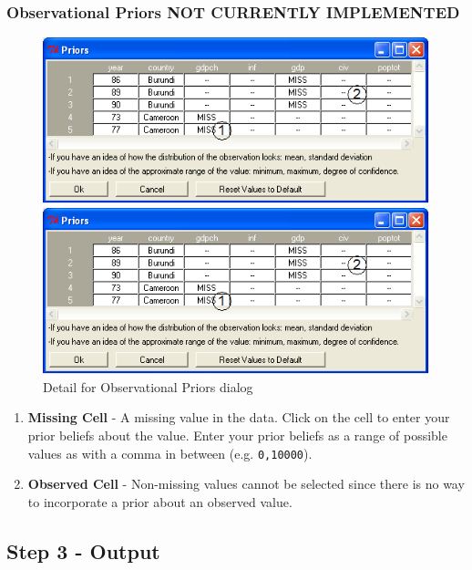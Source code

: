 \documentclass[12pt,titlepage]{article}
\begin{document}
\subsubsection{Observational Priors \textbf{NOT CURRENTLY IMPLEMENTED}}
\label{sec:refobspri}
\begin{figure}[h]
 \begin{htmlonly} 
  \centering \includegraphics[scale=1]{obspri} 
 \end{htmlonly}
 \begin{latexonly}
  \centering \includegraphics[scale=.75]{obspri}
 \end{latexonly}
\caption{Detail for Observational Priors dialog}
\end{figure}
\begin{enumerate}
\item \textbf{Missing Cell} - A missing value in the data.  Click on
  the cell to enter your prior beliefs about the value.  Enter your
  prior beliefs as a range of possible values as with a comma in
  between (e.g. \texttt{0,10000}).
\item \textbf{Observed Cell} - Non-missing values cannot be selected
  since there is no way to incorporate a prior about an observed
  value.
\end{enumerate}

\subsection{Step 3 - Output}
\label{sec:step3}
\end{document}
